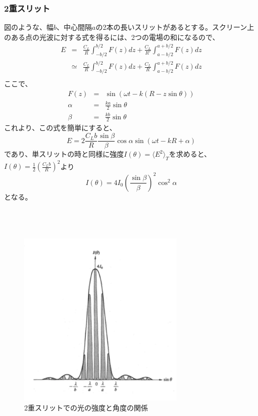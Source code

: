 \documentclass[10pt]{ujarticle}
\begin{document}
\subsubsection{2重スリット}
図のような、幅$b$、中心間隔$a$の2本の長いスリットがあるとする。スクリーン上のある点の光波に対する式を得るには、2つの電場の和になるので、
\begin{eqnarray*}
E &=& \frac{C_L}{R} \int_{-b/2}^{b/2} F(z) dz + \frac{C_L}{R'} \int_{a-b/2}^{a+b/2} F(z) dz \\
&\simeq& \frac{C_L}{R} \int_{-b/2}^{b/2} F(z) dz + \frac{C_L}{R} \int_{a-b/2}^{a+b/2} F(z) dz \\ 
\end{eqnarray*}
ここで、
\begin{eqnarray*}
F(z) &=& \sin(\omega t - k(R-z\sin\theta)) \\
\alpha &=& \frac{ka}{2} \sin\theta \\
\beta &=& \frac{kb}{2} \sin\theta
\end{eqnarray*}
これより、この式を簡単にすると、
\[
E = 2 \frac{C_L b}{R} \frac{\sin\beta}{\beta} \cos\alpha \sin(\omega t -kR + \alpha)
\]
であり、単スリットの時と同様に強度$I(\theta) = \langle E^2\rangle_T$を求めると、$I(\theta) = \frac{1}{2} (\frac{C_L b}{R})^2$より
\[
I(\theta) = 4I_0 \left(\frac{\sin \beta}{\beta}\right)^2 \cos^2 \alpha
\]
となる。\\
\\
\\
\\
\begin{figure}[h]
\begin{center}
\includegraphics[width=8cm, bb = 0 0 400 300]{SummerChallenge_2slits.png}
\caption{2重スリットでの光の強度と角度の関係}
\end{center}
\end{figure}
\end{document}
